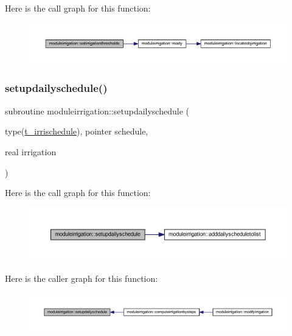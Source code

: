 Here is the call graph for this function\+:\nopagebreak
\begin{figure}[H]
\begin{center}
\leavevmode
\includegraphics[width=350pt]{namespacemoduleirrigation_a7a8a56e2b5c74ba0280ecb4abe6cc726_cgraph}
\end{center}
\end{figure}
\mbox{\label{namespacemoduleirrigation_a056efe3e9f80f4703447f224848ebd47}} 
\subsubsection{\texorpdfstring{setupdailyschedule()}{setupdailyschedule()}}
{\footnotesize\ttfamily subroutine moduleirrigation\+::setupdailyschedule (\begin{DoxyParamCaption}\item[{type(\mbox{\hyperlink{structmoduleirrigation_1_1t__irrischedule}{t\+\_\+irrischedule}}), pointer}]{schedule,  }\item[{real}]{irrigation }\end{DoxyParamCaption})\hspace{0.3cm}{\ttfamily [private]}}

Here is the call graph for this function\+:\nopagebreak
\begin{figure}[H]
\begin{center}
\leavevmode
\includegraphics[width=350pt]{namespacemoduleirrigation_a056efe3e9f80f4703447f224848ebd47_cgraph}
\end{center}
\end{figure}
Here is the caller graph for this function\+:\nopagebreak
\begin{figure}[H]
\begin{center}
\leavevmode
\includegraphics[width=350pt]{namespacemoduleirrigation_a056efe3e9f80f4703447f224848ebd47_icgraph}
\end{center}
\end{figure}
\mbox{\label{namespacemoduleirrigation_a6f3edc54a431fcfb5b0676e0e83f9113}} 
